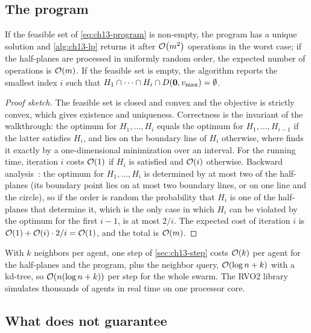 \subsection{The program}

\begin{proposition}
\label{thm:ch13-lp}
If the feasible set of \cref{eq:ch13-program} is non-empty, the program has
a unique solution and \cref{alg:ch13-lp} returns it after $\mathcal{O}\!\left(m^2\right)$
operations in the worst case; if the half-planes are processed in uniformly
random order, the expected number of operations is $\mathcal{O}\!\left(m\right)$. If the
feasible set is empty, the algorithm reports the smallest index $i$ such
that $H_1 \cap \dots \cap H_i \cap D(\mathbf{0},v_{\max}) = \emptyset$.
\end{proposition}
\begin{proof}[Proof sketch]
The feasible set is closed and convex and the objective is strictly convex,
which gives existence and uniqueness. Correctness is the invariant of the
walkthrough: the optimum for $H_1, \dots, H_i$ equals the optimum for
$H_1, \dots, H_{i-1}$ if the latter satisfies $H_i$, and lies on the
boundary line of $H_i$ otherwise, where \OrcaLPLine finds it exactly by a
one-dimensional minimization over an interval. For the running time,
iteration $i$ costs $\mathcal{O}\!\left(1\right)$ if $H_i$ is satisfied and $\mathcal{O}\!\left(i\right)$
otherwise. Backward analysis~\cite{seidel1991small,deberg2008computational}:
the optimum for $H_1, \dots, H_i$ is determined by at most two of the
half-planes (its boundary point lies on at most two boundary lines, or on one
line and the circle), so if the order is random the probability that $H_i$
is one of the half-planes that determine it, which is the only case in
which $H_i$ can be violated by the optimum for the first $i-1$, is at most
$2/i$. The expected cost of iteration $i$ is $\mathcal{O}\!\left(1\right) + \mathcal{O}\!\left(i\right)\cdot 2/i =
\mathcal{O}\!\left(1\right)$, and the total is $\mathcal{O}\!\left(m\right)$.
\end{proof}

With $k$ neighbors per agent, one step of \cref{sec:ch13-step} costs
$\mathcal{O}\!\left(k\right)$ per agent for the half-planes and the program, plus the
neighbor query, $\mathcal{O}\!\left(\log n + k\right)$ with a kd-tree, so $\mathcal{O}\!\left(n(\log n + k)\right)$
per step for the whole swarm. The RVO2 library simulates thousands of agents
in real time on one processor core.

\subsection{What \orca does not guarantee}
\label{sec:ch13-limits}

